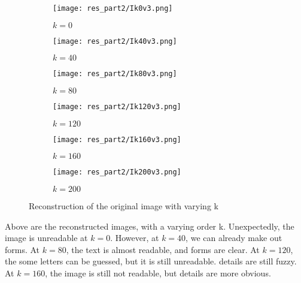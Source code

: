\documentclass{article}
\begin{document}
\begin{figure}[H]
    \centering
    \begin{subfigure}[b]{0.5\textwidth}
        \centering
        \texttt{[image: res\_part2/Ik0v3.png]}
        \caption{$k=0$}
        \label{fig:reconstruction0}
    \end{subfigure}\hspace*{\fill}
    \begin{subfigure}[b]{0.5\textwidth}
        \centering
        \texttt{[image: res\_part2/Ik40v3.png]}
        \caption{$k=40$}
        \label{fig:reconstruction40}
    \end{subfigure}\hspace*{\fill}

    \medskip

    \begin{subfigure}[b]{0.5\textwidth}
        \centering
        \texttt{[image: res\_part2/Ik80v3.png]}
        \caption{$k=80$}
        \label{fig:reconstruction80}
    \end{subfigure}\hspace*{\fill}
    \begin{subfigure}[b]{0.5\textwidth}
        \centering
        \texttt{[image: res\_part2/Ik120v3.png]}
        \caption{$k=120$}
        \label{fig:reconstruction120}
    \end{subfigure}\hspace*{\fill}

    \medskip

    \begin{subfigure}[b]{0.5\textwidth}
        \centering
        \texttt{[image: res\_part2/Ik160v3.png]}
        \caption{$k=160$}
        \label{fig:reconstruction160}
    \end{subfigure}\hspace*{\fill}
    \begin{subfigure}[b]{0.5\textwidth}
        \centering
        \texttt{[image: res\_part2/Ik200v3.png]}
        \caption{$k=200$}
        \label{fig:reconstruction200}
    \end{subfigure}\hspace*{\fill}

    \caption{Reconstruction of the original image with varying k}
    \label{fig:reconstruction}
\end{figure}


    Above are the reconstructed images, with a varying order k. Unexpectedly, the image is unreadable at $k=0$. However, at $k=40$, we can already make out forms.
    At $k=80$, the text is almost readable, and forms are clear. At $k=120$, the some letters can be guessed, but it is still unreadable. details are still fuzzy.
    At $k=160$, the image is still not readable, but details are more obvious.
\end{document}
